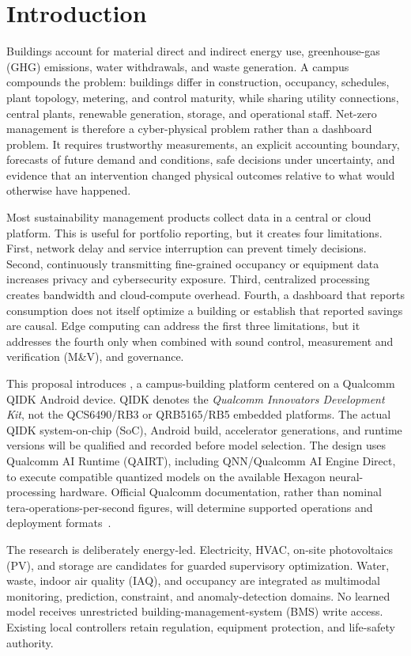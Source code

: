 \section{Introduction}

Buildings account for material direct and indirect energy use, greenhouse-gas (GHG) emissions, water withdrawals, and waste generation. A campus compounds the problem: buildings differ in construction, occupancy, schedules, plant topology, metering, and control maturity, while sharing utility connections, central plants, renewable generation, storage, and operational staff. Net-zero management is therefore a cyber-physical problem rather than a dashboard problem. It requires trustworthy measurements, an explicit accounting boundary, forecasts of future demand and conditions, safe decisions under uncertainty, and evidence that an intervention changed physical outcomes relative to what would otherwise have happened.

Most sustainability management products collect data in a central or cloud platform. This is useful for portfolio reporting, but it creates four limitations. First, network delay and service interruption can prevent timely decisions. Second, continuously transmitting fine-grained occupancy or equipment data increases privacy and cybersecurity exposure. Third, centralized processing creates bandwidth and cloud-compute overhead. Fourth, a dashboard that reports consumption does not itself optimize a building or establish that reported savings are causal. Edge computing can address the first three limitations, but it addresses the fourth only when combined with sound control, measurement and verification (M\&V), and governance.

This proposal introduces \system{}, a campus-building platform centered on a Qualcomm QIDK Android device. QIDK denotes the \emph{Qualcomm Innovators Development Kit}, not the QCS6490/RB3 or QRB5165/RB5 embedded platforms. The actual QIDK system-on-chip (SoC), Android build, accelerator generations, and runtime versions will be qualified and recorded before model selection. The design uses Qualcomm AI Runtime (QAIRT), including QNN/Qualcomm AI Engine Direct, to execute compatible quantized models on the available Hexagon neural-processing hardware. Official Qualcomm documentation, rather than nominal tera-operations-per-second figures, will determine supported operations and deployment formats~\cite{qualcomm_qidk,qualcomm_qairect,qualcomm_aihub_compile}.

The research is deliberately energy-led. Electricity, HVAC, on-site photovoltaics (PV), and storage are candidates for guarded supervisory optimization. Water, waste, indoor air quality (IAQ), and occupancy are integrated as multimodal monitoring, prediction, constraint, and anomaly-detection domains. No learned model receives unrestricted building-management-system (BMS) write access. Existing local controllers retain regulation, equipment protection, and life-safety authority.

